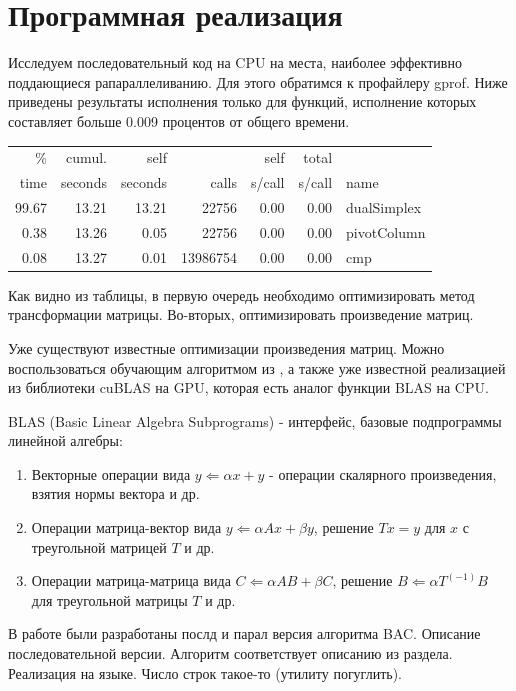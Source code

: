 \documentclass[a4paper,14pt,russian]{extreport}
\begin{document}
\section{Программная реализация}

Исследуем последовательный код на CPU на места, наиболее эффективно поддающиеся рапараллеливанию. Для этого обратимся к профайлеру gprof. Ниже приведены результаты исполнения только для функций, исполнение которых составляет больше 0.009 процентов от общего времени.
\\
\begin{tabular}{rrrrrrp{3cm}}
  \% &  cumul. &  self    & &         self  &   total    \\       
 time  & seconds &  seconds  &  calls &  s/call &  s/call & name    \\
 99.67  &   13.21  &  13.21 &   22756 &    0.00 &    0.00 & dualSimplex\\
  0.38  &   13.26  &   0.05  &  22756 &    0.00  &   0.00 & pivotColumn\\
  0.08   &  13.27 &    0.01 & 13986754 &    0.00 &    0.00 &  cmp\\
\end{tabular}
\par Как видно из таблицы, в первую очередь необходимо оптимизировать метод трансформации матрицы. Во-вторых, оптимизировать произведение матриц. 
\par Уже существуют известные оптимизации произведения матриц. Можно воспользоваться обучающим алгоритмом из \cite{cuda_best_matr}, а также уже известной реализацией из библиотеки cuBLAS на GPU, которая есть аналог функции BLAS на CPU. 
\par BLAS (Basic Linear Algebra Subprograms) - интерфейс, базовые подпрограммы линейной алгебры:
  \begin{enumerate}
  \item Векторные операции вида $y\Leftarrow\alpha x + y$ - операции скалярного произведения, взятия нормы вектора и др.
  \item Операции матрица-вектор вида $y\Leftarrow\alpha Ax + \beta y$, решение $Tx = y$ для $x$ с треугольной матрицей $T$ и др.
  \item Операции матрица-матрица вида $C\Leftarrow \alpha AB + \beta C$, решение $B\Leftarrow \alpha T^(-1)B$ для треугольной матрицы $T$ и др.
  \end{enumerate}
\par В работе были разработаны послд и  парал версия алгоритма BAC. Описание последовательной версии. Алгоритм соответствует описанию из раздела. Реализация на языке. Число строк такое-то (утилиту погуглить). 
\end{document}
